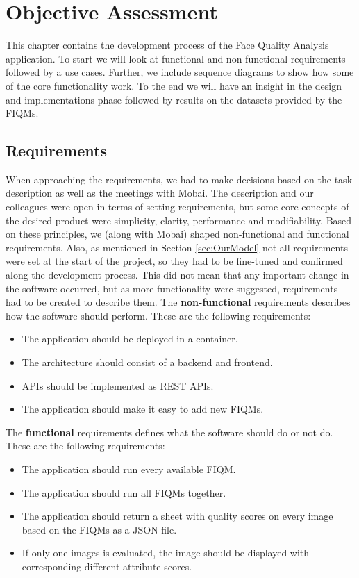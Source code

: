 \chapter{Objective Assessment}
\label{chap:objective}
This chapter contains the development process of the Face Quality Analysis application. To start we will look at functional and non-functional requirements followed by a use cases. Further, we include sequence diagrams to show how some of the core functionality work. To the end we will have an insight in the design and implementations phase followed by results on the datasets provided by the FIQMs.

\section{Requirements}
When approaching the requirements, we had to make decisions based on the task description  as well as the meetings with Mobai. The description and our colleagues were open in terms of setting requirements, but some core concepts of the desired product were simplicity, clarity, performance and modifiability. Based on these principles, we (along with Mobai) shaped non-functional and functional requirements. Also, as mentioned in Section \ref{sec:OurModel} not all requirements were set at the start of the project, so they had to be fine-tuned and confirmed along the development process. This did not mean that any important change in the software occurred, but as more functionality were suggested, requirements had to be created to describe them. The \textbf{non-functional} requirements describes how the software should perform. These are the following requirements:
\begin{itemize}
    \item The application should be deployed in a container.
    \item The architecture should consist of a backend and frontend.
    \item APIs should be implemented as REST APIs.
    \item The application should make it easy to add new FIQMs.
\end{itemize}
The \textbf{functional} requirements defines what the software should do or not do. These are the following requirements:
\begin{itemize}
    \item The application should run every available FIQM.
    \item The application should run all FIQMs together.
    \item The application should return a sheet with quality scores on every image based on the FIQMs as a JSON file.
    \item If only one images is evaluated, the image should be displayed with corresponding different attribute scores. 
\end{itemize}

